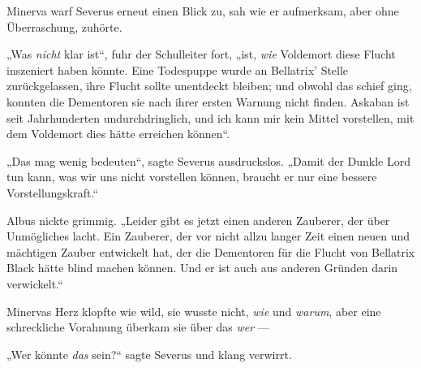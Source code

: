 Minerva warf Severus erneut einen Blick zu, sah wie er aufmerksam, aber ohne Überraschung, zuhörte.

„Was \emph{nicht} klar ist“, fuhr der Schulleiter fort, „ist, \emph{wie} Voldemort diese Flucht inszeniert haben könnte. Eine Todespuppe wurde an Bellatrix’ Stelle zurückgelassen, ihre Flucht sollte unentdeckt bleiben; und obwohl das schief ging, konnten die Dementoren sie nach ihrer ersten Warnung nicht finden. Askaban ist seit Jahrhunderten undurchdringlich, und ich kann mir kein Mittel vorstellen, mit dem Voldemort dies hätte erreichen können“.

„Das mag wenig bedeuten“, sagte Severus ausdruckslos.
„Damit der Dunkle Lord tun kann, was wir uns nicht vorstellen können, braucht er nur eine bessere Vorstellungskraft.“

Albus nickte grimmig.
„Leider gibt es jetzt einen anderen Zauberer, der über Unmögliches lacht. Ein Zauberer, der vor nicht allzu langer Zeit einen neuen und mächtigen Zauber entwickelt hat, der die Dementoren für die Flucht von Bellatrix Black hätte blind machen können. Und er ist auch aus anderen Gründen darin verwickelt.“

Minervas Herz klopfte wie wild, sie wusste nicht, \emph{wie} und \emph{warum}, aber eine schreckliche Vorahnung überkam sie über das \emph{wer} —

„Wer könnte \emph{das} sein?“ sagte Severus und klang verwirrt.

